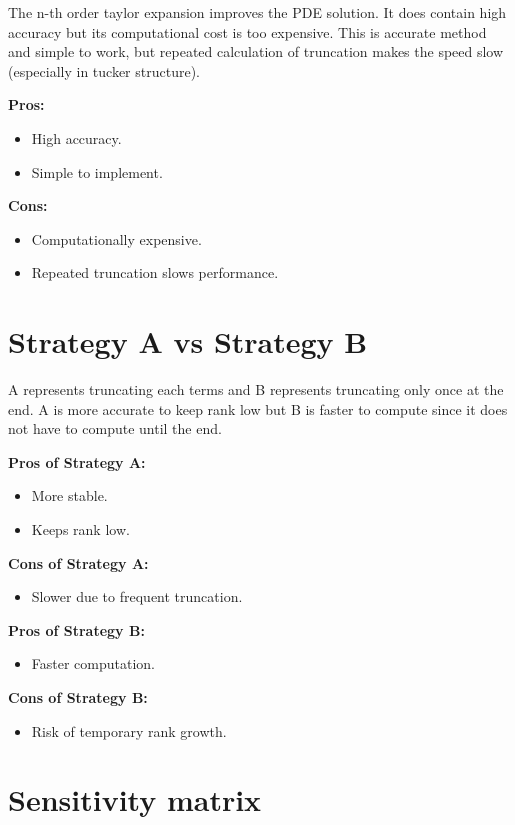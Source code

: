 \documentclass{article}
\begin{document}
The n-th order taylor expansion improves the PDE solution. It does contain high accuracy but its computational cost is too expensive. This is accurate method and simple to work, but repeated calculation of truncation makes the speed slow (especially in tucker structure).

\textbf{Pros:}
\begin{itemize}
    \item High accuracy.
    \item Simple to implement.
\end{itemize}

\textbf{Cons:}
\begin{itemize}
    \item Computationally expensive.
    \item Repeated truncation slows performance.
\end{itemize}


\section*{Strategy A vs Strategy B}

A represents truncating each terms and B represents truncating only once at the end. A is more accurate to keep rank low but B is faster to compute since it does not have to compute until the end.

\textbf{Pros of Strategy A:}
\begin{itemize}
    \item More stable.
    \item Keeps rank low.
\end{itemize}

\textbf{Cons of Strategy A:}
\begin{itemize}
    \item Slower due to frequent truncation.
\end{itemize}

\textbf{Pros of Strategy B:}
\begin{itemize}
    \item Faster computation.
\end{itemize}

\textbf{Cons of Strategy B:}
\begin{itemize}
    \item Risk of temporary rank growth.
\end{itemize}
\section*{Sensitivity matrix}
\end{document}
